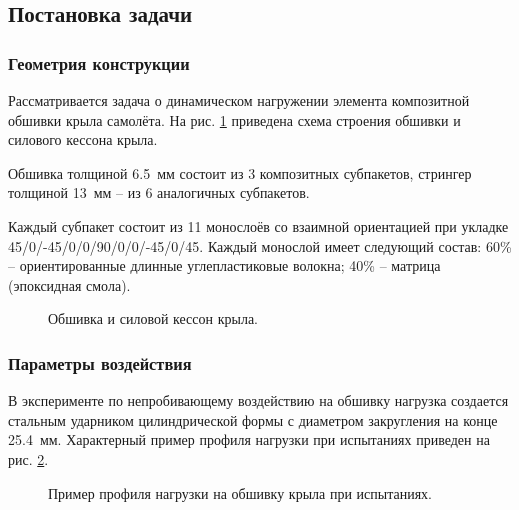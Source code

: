 \subsection{Постановка задачи}

\subsubsection*{Геометрия конструкции}

Рассматривается задача о динамическом нагружении элемента композитной обшивки крыла самолёта. На рис.
\ref{pic:construction} приведена схема строения обшивки и силового кессона крыла. 

Обшивка толщиной 6.5~мм состоит из 3 композитных субпакетов, стрингер толщиной 13~мм -- из 6 аналогичных субпакетов.

Каждый субпакет состоит из 11 монослоёв со взаимной ориентацией при укладке 
45/0/-45/0/0/90/0/0/-45/0/45. Каждый монослой имеет следующий состав: 60\% -- 
ориентированные длинные углепластиковые волокна; 40\% -- матрица
(эпоксидная смола). 

\begin{figure}[h]
\caption{Обшивка и силовой кессон крыла.}
\label{pic:construction}
\end{figure}

\subsubsection*{Параметры воздействия}

В эксперименте по непробивающему воздействию на обшивку нагрузка создается стальным 
ударником цилиндрической формы с диаметром закругления на конце 25.4~мм. Характерный пример профиля нагрузки 
при испытаниях приведен на рис. \ref{pic:loadprofile}.
\begin{figure}[h]
\caption{Пример профиля нагрузки на обшивку крыла при испытаниях.}
\label{pic:loadprofile}
\end{figure}

